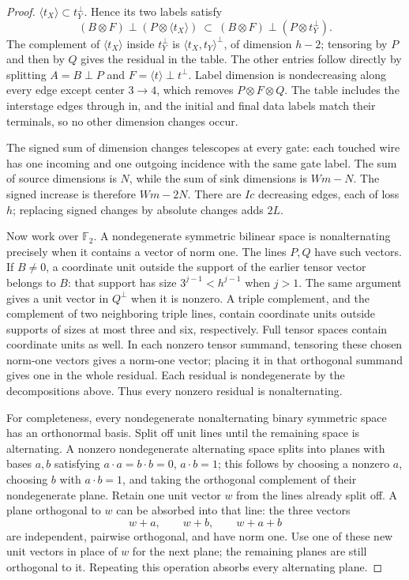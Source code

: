 \begin{proof}
$\langle t_X\rangle\subset t_Y^\perp$.  Hence its two labels satisfy
\[
 (B\otimes F)\mathbin{\perp}(P\otimes\langle t_X\rangle)
 \ \subset\
 (B\otimes F)\mathbin{\perp}(P\otimes t_Y^\perp).
\]
The complement of $\langle t_X\rangle$ inside $t_Y^\perp$ is
$\langle t_X,t_Y\rangle^\perp$, of dimension $h-2$; tensoring by
$P$ and then by $Q$ gives the residual in the table.  The other entries
follow directly by splitting $A=B\mathbin{\perp}P$ and
$F=\langle t\rangle\mathbin{\perp}t^\perp$.
Label dimension is nondecreasing along every edge except center $3\to4$, which removes
$P\otimes F\otimes Q$.  The table includes the interstage edges through
$\mathrm{in}$, and the initial and final data labels match their terminals,
so no other dimension changes occur.

The signed sum of dimension changes telescopes at every gate: each
touched wire has one incoming and one outgoing incidence with the same
gate label.  The sum of source dimensions is $N$, while the sum of
sink dimensions is $Wm-N$.  The signed increase is therefore $Wm-2N$.
There are $Ic$ decreasing edges, each of loss $h$; replacing signed
changes by absolute changes adds $2L$.

Now work over $\mathbb F_2$.  A nondegenerate symmetric bilinear space
is nonalternating precisely when it contains a vector of norm one.
The lines $P,Q$ have such vectors.  If $B\ne0$, a coordinate unit
outside the support of the earlier tensor vector belongs to $B$:
that support has size $3^{j-1}<h^{j-1}$ when $j>1$.
The same argument gives a unit vector in $Q^\perp$ when it is nonzero.
A triple complement, and the complement of two neighboring triple
lines, contain coordinate units outside supports of sizes at most
three and six, respectively.  Full tensor spaces contain coordinate
units as well.  In each nonzero tensor summand, tensoring these chosen
norm-one vectors gives a norm-one vector; placing it in that orthogonal
summand gives one in the whole residual.  Each residual is nondegenerate
by the decompositions above.  Thus every nonzero residual is nonalternating.

For completeness, every nondegenerate nonalternating binary symmetric
space has an orthonormal basis.  Split off unit lines until the
remaining space is alternating.  A nonzero nondegenerate alternating
space splits into planes with bases $a,b$ satisfying
$a\cdot a=b\cdot b=0$, $a\cdot b=1$; this follows by choosing a
nonzero $a$, choosing $b$ with $a\cdot b=1$, and taking the orthogonal
complement of their nondegenerate plane.  Retain one unit vector $w$
from the lines already split off.  A plane orthogonal to $w$ can be
absorbed into that line: the three vectors
\[
 w+a,\qquad w+b,\qquad w+a+b
\]
are independent, pairwise orthogonal, and have norm one.
Use one of these new unit vectors in place of $w$ for the next plane;
the remaining planes are still orthogonal to it.  Repeating this
operation absorbs every alternating plane.
\end{proof}

